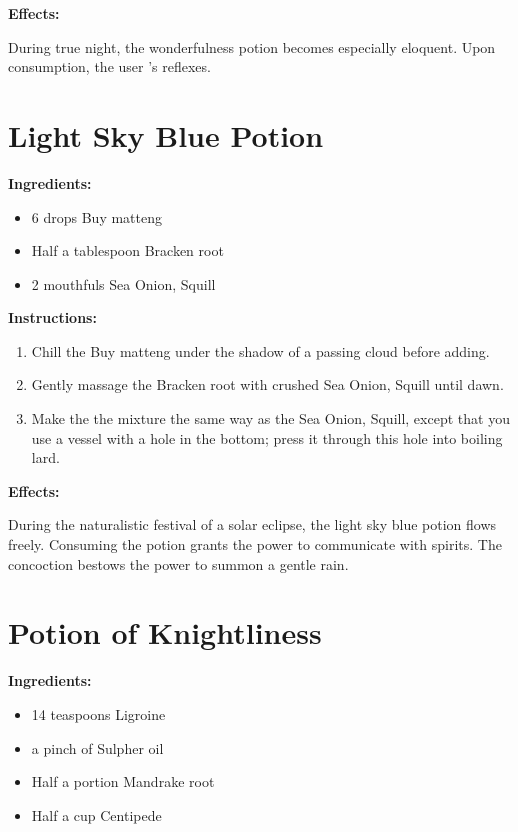 \documentclass{article}
\begin{document}
\textbf{Effects:}

During true night, the wonderfulness potion becomes especially eloquent. Upon consumption, the user 's reflexes.

\newpage
\section*{Light Sky Blue Potion}

\textbf{Ingredients:}

\begin{itemize}
  \item 6 drops Buy matteng
  \item Half a tablespoon Bracken root
  \item 2 mouthfuls Sea Onion, Squill
\end{itemize}

\textbf{Instructions:}

\begin{enumerate}
  \item Chill the Buy matteng under the shadow of a passing cloud before adding.
  \item Gently massage the Bracken root with crushed Sea Onion, Squill until dawn.
  \item Make the the mixture the same way as the Sea Onion, Squill, except that you use a vessel with a hole in the bottom; press it through this hole into boiling lard.
\end{enumerate}

\textbf{Effects:}

During the naturalistic festival of a solar eclipse, the light sky blue potion flows freely. Consuming the potion grants the power to communicate with spirits. The concoction bestows the power to summon a gentle rain.

\newpage
\section*{Potion of Knightliness}

\textbf{Ingredients:}

\begin{itemize}
  \item 14 teaspoons Ligroine
  \item a pinch of Sulpher oil
  \item Half a portion Mandrake root
  \item Half a cup Centipede
\end{itemize}
\end{document}
